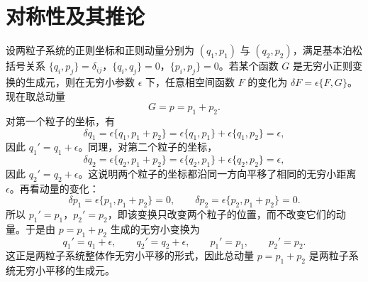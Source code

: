 ﻿%
\section{对称性及其推论}

\begin{solution}[无穷小平移]
\answer
设两粒子系统的正则坐标和正则动量分别为 $(q_1,p_1)$ 与 $(q_2,p_2)$，满足基本泊松括号关系 $\{q_i,p_j\}=\delta_{ij}$，$\{q_i,q_j\}=0$，$\{p_i,p_j\}=0$。若某个函数 $G$ 是无穷小正则变换的生成元，则在无穷小参数 $\epsilon$ 下，任意相空间函数 $F$ 的变化为 $\delta F=\epsilon\{F,G\}$。现在取总动量
\[
G=p=p_1+p_2.
\]
对第一个粒子的坐标，有
\[
\delta q_1=\epsilon\{q_1,p_1+p_2\}=\epsilon\{q_1,p_1\}+\epsilon\{q_1,p_2\}=\epsilon,
\]
因此 $q_1'=q_1+\epsilon$。同理，对第二个粒子的坐标，
\[
\delta q_2=\epsilon\{q_2,p_1+p_2\}=\epsilon\{q_2,p_1\}+\epsilon\{q_2,p_2\}=\epsilon,
\]
因此 $q_2'=q_2+\epsilon$。这说明两个粒子的坐标都沿同一方向平移了相同的无穷小距离 $\epsilon$。再看动量的变化：
\[
\delta p_1=\epsilon\{p_1,p_1+p_2\}=0,\qquad \delta p_2=\epsilon\{p_2,p_1+p_2\}=0.
\]
所以 $p_1'=p_1$，$p_2'=p_2$，即该变换只改变两个粒子的位置，而不改变它们的动量。于是由 $p=p_1+p_2$ 生成的无穷小变换为
\[
q_1'=q_1+\epsilon,\qquad q_2'=q_2+\epsilon,\qquad p_1'=p_1,\qquad p_2'=p_2.
\]
这正是两粒子系统整体作无穷小平移的形式，因此总动量 $p=p_1+p_2$ 是两粒子系统无穷小平移的生成元。
\end{solution}

